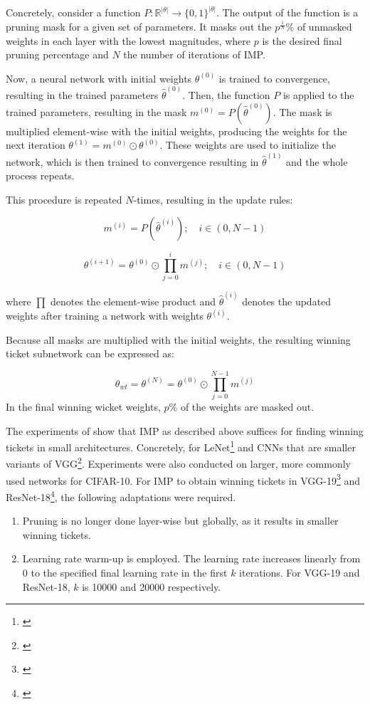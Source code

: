 Concretely, consider a function  $\textit{P} : \mathbb{R}^{|\theta|} \to \{0,1\}^{|\theta|}$.
The output of the function is a pruning mask for a given set of parameters.
It masks out the $p^{\frac{1}{N}}$\% of unmasked weights in each layer with the lowest magnitudes, where $p$ is the desired final pruning percentage and $N$ the number of iterations of IMP.

Now, a neural network with initial weights $\theta^{(0)}$ is trained to convergence, resulting in the trained parameters $\hat \theta^{(0)}$.
Then, the function $\textit{P}$ is applied to the trained parameters, resulting in the mask $m^{(0)} = \textit{P}(\hat \theta^{(0)})$.
The mask is multiplied element-wise with the initial weights, producing the weights for the next iteration $\theta^{(1)} = m^{(0)} \odot \theta^{(0)}$.
These weights are used to initialize the network, which is then trained to convergence resulting in $\hat \theta^{(1)}$ and the whole process repeats.

This procedure is repeated $N$-times, resulting in the update rules:

$$
m^{(i)} = \textit{P}(\hat \theta^{(i)}); \quad i \in (0,N-1)
$$

$$
\theta^{(i+1)} = \theta^{(0)} \odot \prod_{j=0}^{i}m^{(j)}; \quad i \in (0,N-1)
$$ 

where $\prod$ denotes the element-wise product and $\hat \theta^{(i)}$ denotes the updated weights after training a network with weights $\theta^{(i)}$.

Because all masks are multiplied with the initial weights, the resulting winning ticket subnetwork can be expressed as:

$$
\theta_{wt} = \theta^{(N)} = \theta^{(0)} \odot \prod_{j=0}^{N-1}m^{(j)}
$$
In the final winning wicket weights, $p$\% of the weights are masked out.

The experiments of \autocite{DBLP:conf/iclr/FrankleC19} show that IMP as described above suffices for finding winning tickets in small architectures.
Concretely, for LeNet\footnote{\cite{cnn}} and CNNs that are smaller variants of VGG\footnote{\cite{SimonyanZisserman}}.
Experiments were also conducted on larger, more commonly used networks for CIFAR-10. For IMP to obtain winning tickets in VGG-19\footnote{\cite{Liu19}} and ResNet-18\footnote{\cite{ResidualConnect}}, the following adaptations were required. 
\begin{enumerate}
  \item  Pruning is no longer done layer-wise but globally, as it results in smaller winning tickets. 
  \item Learning rate warm-up is employed. The learning rate increases linearly from 0 to the specified final learning rate in the first $k$ iterations. For VGG-19 and ResNet-18, $k$ is 10000 and 20000 respectively.
\end{enumerate}

